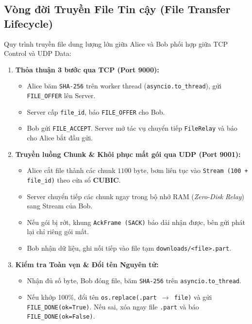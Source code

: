 \subsection{Vòng đời Truyền File Tin cậy (File Transfer Lifecycle)}
Quy trình truyền file dung lượng lớn giữa Alice và Bob phối hợp giữa TCP Control và UDP Data:
\begin{enumerate}
    \item \textbf{Thỏa thuận 3 bước qua TCP (Port 9000):}
    \begin{itemize}
        \item Alice băm \texttt{SHA-256} trên worker thread (\texttt{asyncio.to\_thread}), gửi \texttt{FILE\_OFFER} lên Server.
        \item Server cấp \texttt{file\_id}, báo \texttt{FILE\_OFFER} cho Bob.
        \item Bob gửi \texttt{FILE\_ACCEPT}. Server mở tác vụ chuyển tiếp \texttt{FileRelay} và báo cho Alice bắt đầu gửi.
    \end{itemize}
    \item \textbf{Truyền luồng Chunk \& Khôi phục mất gói qua UDP (Port 9001):}
    \begin{itemize}
        \item Alice cắt file thành các chunk $1100\text{ byte}$, bơm liên tục vào \texttt{Stream (100 + file\_id)} theo cửa sổ \textbf{CUBIC}.
        \item Server chuyển tiếp các chunk ngay trong bộ nhớ RAM (\textit{Zero-Disk Relay}) sang Stream của Bob.
        \item Nếu gói bị rớt, khung \texttt{AckFrame (SACK)} báo dải nhận được, bên gửi phát lại chỉ riêng gói mất.
        \item Bob nhận dữ liệu, ghi nối tiếp vào file tạm \texttt{downloads/<file>.part}.
    \end{itemize}
    \item \textbf{Kiểm tra Toàn vẹn \& Đổi tên Nguyên tử:}
    \begin{itemize}
        \item Nhận đủ số byte, Bob đóng file, băm \texttt{SHA-256} trên \texttt{asyncio.to\_thread}.
        \item Nếu khớp 100\%, đổi tên \texttt{os.replace(.part $\rightarrow$ file)} và gửi \texttt{FILE\_DONE(ok=True)}. Nếu sai, xóa ngay file \texttt{.part} và báo \texttt{FILE\_DONE(ok=False)}.
    \end{itemize}
\end{enumerate}

